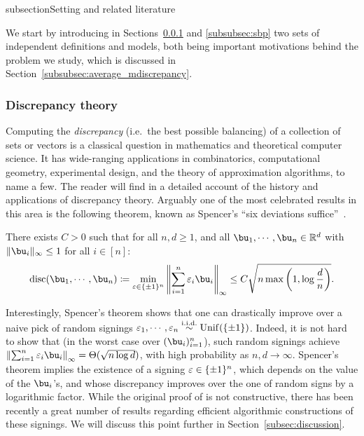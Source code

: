 subsection{Setting and related literature}

We start by introducing in Sections~\ref{subsubsec:discrepancy} and \ref{subsubsec:sbp} two sets of independent definitions and models,
both being important motivations behind the problem we study, which is discussed in Section~\ref{subsubsec:average_mdiscrepancy}.

\subsubsection{Discrepancy theory}\label{subsubsec:discrepancy}

Computing the \emph{discrepancy} (i.e.\ the best possible balancing) of a collection of sets or vectors 
is a classical question in mathematics and theoretical computer science. 
It has wide-ranging applications in combinatorics, computational geometry,
experimental design, and the theory of approximation algorithms, to name a few. 
The reader will find in \cite{spencer1994ten,matousek2009geometric,chen2014panorama} a detailed account of the history and applications of 
discrepancy theory.
Arguably one of the most celebrated results in this area is the following theorem, known as Spencer's ``six deviations suffice''~\citep{spencer1985six}.
\begin{theorem}
    \label{thm:spencer}
    There exists $C > 0$ such that for all $n, d \geq 1$, and all $\bu_1, \cdots, \bu_n \in \bbR^d$ with $\|\bu_i\|_\infty \leq 1$ for all $i \in [n]$: 
    \begin{equation*}
       \disc(\bu_1, \cdots, \bu_n) \coloneqq \min_{\eps \in \{\pm 1\}^n} \left\|\sum_{i=1}^n \eps_i \bu_i\right\|_\infty \leq C \sqrt{n \max \left(1, \log \frac{d}{n}\right)}.
    \end{equation*}
\end{theorem}
\noindent
Interestingly, Spencer's theorem shows that one can drastically improve over a naive pick of random signings $\varepsilon_1, \cdots, \varepsilon_n \overset{\mathrm{i.i.d.}}{\sim} \mathrm{Unif}(\{\pm 1\})$. Indeed, 
it is not hard to show that (in the worst case over $(\bu_i)_{i=1}^n$), such random signings achieve $\left\|\sum_{i=1}^n \eps_i \bu_i\right\|_\infty = \Theta(\sqrt{n \log d})$, 
with high probability as $n, d \to \infty$. Spencer's theorem implies the existence of a signing $\varepsilon \in \{\pm 1\}^n$, 
which depends on the value of the $\bu_i$'s, and whose discrepancy improves over the one of random signs by a logarithmic factor.
While the original proof of \cite{spencer1985six} is not constructive, there has been recently a great number of results regarding efficient algorithmic constructions of 
these signings. We will discuss this point further in Section~\ref{subsec:discussion}.

